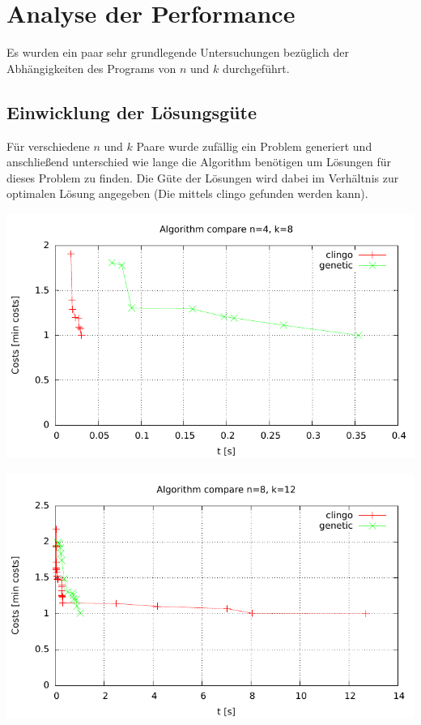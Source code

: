 \section{Analyse der Performance}

Es wurden ein paar sehr grundlegende Untersuchungen bezüglich der Abhängigkeiten des Programs von $n$ und $k$ durchgeführt.

\subsection{Einwicklung der Lösungsgüte}

Für verschiedene $n$ und $k$ Paare wurde zufällig ein Problem generiert und anschließend unterschied wie lange die Algorithm benötigen um Lösungen für dieses Problem zu finden. Die Güte der Lösungen wird dabei im Verhältnis zur optimalen Lösung angegeben (Die mittels clingo gefunden werden kann).

\includegraphics{../../plots/algorithmCompare-n4-k8.pdf}

\includegraphics{../../plots/algorithmCompare-n8-k12.pdf}

